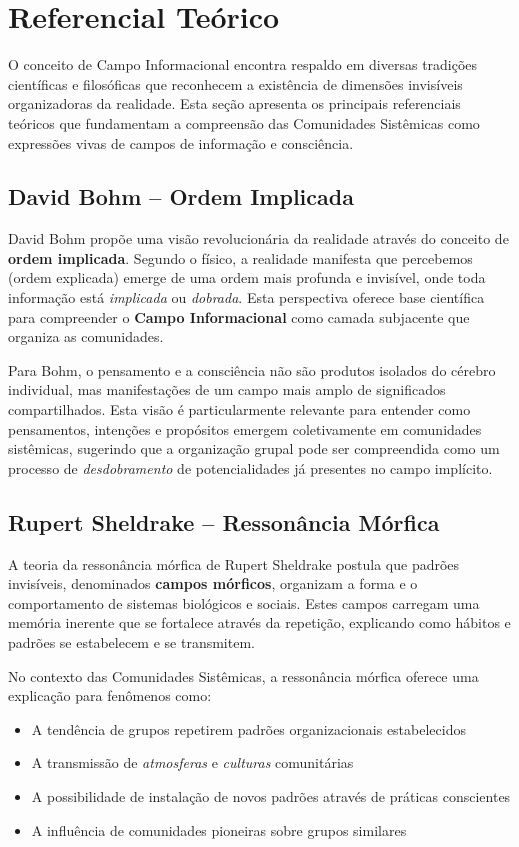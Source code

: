 \section{Referencial Teórico}

O conceito de Campo Informacional encontra respaldo em diversas tradições científicas e filosóficas que reconhecem a existência de dimensões invisíveis organizadoras da realidade. Esta seção apresenta os principais referenciais teóricos que fundamentam a compreensão das Comunidades Sistêmicas como expressões vivas de campos de informação e consciência.

\subsection{David Bohm – Ordem Implicada}

David Bohm \cite{bohm1980wholeness} propõe uma visão revolucionária da realidade através do conceito de \textbf{ordem implicada}. Segundo o físico, a realidade manifesta que percebemos (ordem explicada) emerge de uma ordem mais profunda e invisível, onde toda informação está \textit{implicada} ou \textit{dobrada}. Esta perspectiva oferece base científica para compreender o \textbf{Campo Informacional} como camada subjacente que organiza as comunidades.

Para Bohm, o pensamento e a consciência não são produtos isolados do cérebro individual, mas manifestações de um campo mais amplo de significados compartilhados. Esta visão é particularmente relevante para entender como pensamentos, intenções e propósitos emergem coletivamente em comunidades sistêmicas, sugerindo que a organização grupal pode ser compreendida como um processo de \textit{desdobramento} de potencialidades já presentes no campo implícito.

\subsection{Rupert Sheldrake – Ressonância Mórfica}

A teoria da ressonância mórfica de Rupert Sheldrake \cite{sheldrake1981new} postula que padrões invisíveis, denominados \textbf{campos mórficos}, organizam a forma e o comportamento de sistemas biológicos e sociais. Estes campos carregam uma memória inerente que se fortalece através da repetição, explicando como hábitos e padrões se estabelecem e se transmitem.

No contexto das Comunidades Sistêmicas, a ressonância mórfica oferece uma explicação para fenômenos como:
\begin{itemize}
    \item A tendência de grupos repetirem padrões organizacionais estabelecidos
    \item A transmissão de \textit{atmosferas} e \textit{culturas} comunitárias
    \item A possibilidade de instalação de novos padrões através de práticas conscientes
    \item A influência de comunidades pioneiras sobre grupos similares
\end{itemize}

